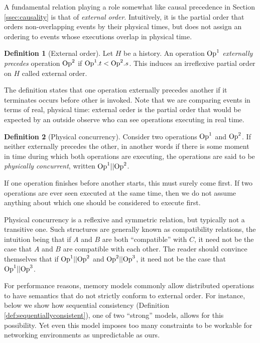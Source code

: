 \documentclass[]             %
{NASA}                       %
\theoremstyle{definition}
\newtheorem{definition}{Definition}[section]
\begin{document}
A fundamental relation playing a role somewhat like causal precedence
in Section \ref{ssec:causality} is that of \emph{external
  order}. Intuitively, it is the partial order that orders
non-overlapping events by their physical times, but does not assign an
ordering to events whose executions overlap in physical time.

\begin{definition}[External order]
  Let $H$ be a history. An operation $\mathrm{Op}^1$ \emph{externally
    precedes} operation $\mathrm{Op}^2$ if $\mathrm{Op}^1.t < \mathrm{Op}^2.s$. This induces
  an irreflexive partial order on $H$ called external order.
\end{definition}
The definition states that one operation externally precedes another
if it terminates occurs before other is invoked. Note that we are
comparing events in terms of real, physical time: external order is
the partial order that would be expected by an outside observe who can
see operations executing in real time.
\begin{definition}[Physical concurrency]
  Consider two operations $\mathrm{Op}^1$ and $\mathrm{Op}^2$. If neither externally
  precedes the other, in another words if there is some moment in time
  during which both operations are executing, the operations are said
  to be \emph{physically concurrent}, written $\mathrm{Op}^1 || \mathrm{Op}^2$.
\end{definition}
If one operation finishes
before another starts, this must surely come first. If two operations
are ever seen executed at the same time, then we do not assume
anything about which one should be considered to execute first.


Physical concurrency is a reflexive and symmetric relation, but
typically not a transitive one. Such structures are generally known as
compatibility relations, the intuition being that if \(A\) and \(B\) are
both ``compatible'' with \(C\), it need not be the case that \(A\) and
\(B\) are compatible with each other. The reader should convince
themselves that if $\mathrm{Op}^1 || \mathrm{Op}^2$ and $\mathrm{Op}^2 || \mathrm{Op}^3$, it need not
be the case that $\mathrm{Op}^1 || \mathrm{Op}^3$.

For performance reasons, memory models commonly allow distributed
operations to have semantics that do not strictly conform to external
order. For instance, below we show how sequential consistency
(Definition \ref{def:sequentiallyconsistent}), one of two ``strong''
models, allows for this possibility. Yet even this model imposes too
many constraints to be workable for networking environments as
unpredictable as ours.
\end{document}

